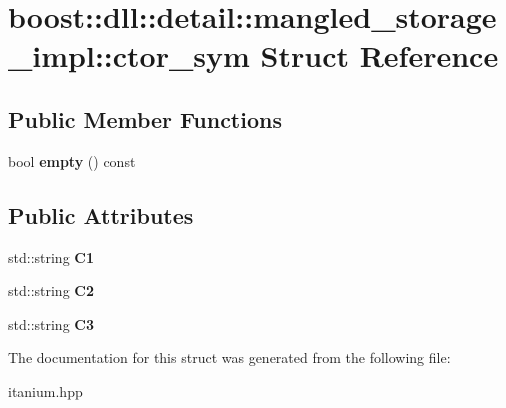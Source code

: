 \hypertarget{a01372}{}\section{boost\+:\+:dll\+:\+:detail\+:\+:mangled\+\_\+storage\+\_\+impl\+:\+:ctor\+\_\+sym Struct Reference}
\label{a01372}
\subsection*{Public Member Functions}
\begin{DoxyCompactItemize}
\item 
\mbox{\label{a01372_a43e1e554b5db29877cf5caf894f7f9b0}} 
bool {\bfseries empty} () const
\end{DoxyCompactItemize}
\subsection*{Public Attributes}
\begin{DoxyCompactItemize}
\item 
\mbox{\label{a01372_ac9013659c224761b2a4ed93497a5befe}} 
std\+::string {\bfseries C1}
\item 
\mbox{\label{a01372_a16e1494cd3bad943a255c357107ff317}} 
std\+::string {\bfseries C2}
\item 
\mbox{\label{a01372_a9fb3a1d9ebd5863d39914a4ffa1cf2de}} 
std\+::string {\bfseries C3}
\end{DoxyCompactItemize}


The documentation for this struct was generated from the following file\+:\begin{DoxyCompactItemize}
\item 
itanium.\+hpp\end{DoxyCompactItemize}
